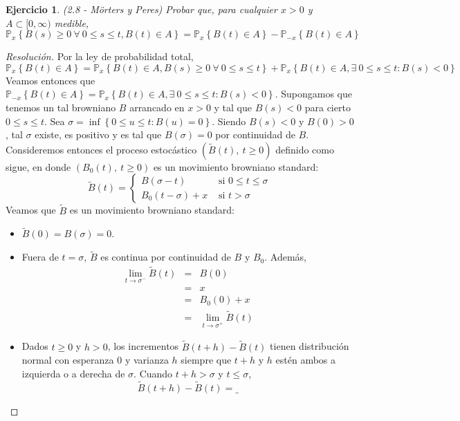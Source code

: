 \documentclass[a4paper,11pt]{article}
\newcommand{\Probx}[2]{\ensuremath{\mathbb{P}_{#1} \left\{ #2 \right\}}}
\newtheorem*{ej}{Ejercicio}
\begin{document}

\begin{ej}
(2.8 - Mörters y Peres) Probar que, para cualquier $x > 0$ y $A \subset [0,\infty)$ medible,
$$\Probx{x}{B(s) \geq 0 ~\forall~ 0 \leq s \leq t, B(t) \in A} = \Probx{x}{B(t) \in A} - \Probx{-x}{B(t) \in A}$$
\end{ej}

\begin{proof}[Resoluci\'on]
Por la ley de probabilidad total,
$$\Probx{x}{B(t) \in A} = \Probx{x}{B(t) \in A, B(s) \geq 0 ~\forall~ 0 \leq s \leq t} + 
    \Probx{x}{B(t) \in A, \exists~0 \leq s \leq t : B(s) < 0}$$
Veamos entonces que $\Probx{-x}{B(t) \in A} = \Probx{x}{B(t) \in A, \exists~0 \leq s \leq t : B(s) < 0}$. Supongamos
que tenemos un tal browniano $B$ arrancado en $x > 0$ y tal que $B(s) < 0$ para cierto $0 \leq s \leq t$.
Sea $\sigma = \inf \left\{ 0 \leq u \leq t : B(u) = 0 \right\}$. Siendo $B(s) < 0$ y $B(0) > 0$, tal $\sigma$    
existe, es positivo y es tal que $B(\sigma) = 0$ por continuidad de $B$. Consideremos entonces el proceso estocástico
$(\tilde{B}(t),~ t \geq 0)$ definido como sigue, en donde $(B_0(t),~t \geq 0)$ es un movimiento browniano standard:
$$
\tilde{B}(t) = 
\begin{cases}
B(\sigma -t) & \textrm{ si } 0 \leq t \leq \sigma \\
B_0(t - \sigma) + x & \textrm{ si } t > \sigma
\end{cases}
$$
Veamos que $\tilde{B}$ es un movimiento browniano standard:
\begin{itemize}
    \item $\tilde{B}(0) = B(\sigma) = 0$.
    \item Fuera de $t = \sigma$, $\tilde{B}$ es continua por continuidad de $B$ y $B_0$. Además,
    \begin{eqnarray*}
        \lim_{t \to \sigma^{-}}{\tilde{B}(t)} &=& B(0) \\
            &=& x \\
            &=& B_0(0) + x \\
            &=& \lim_{t \to \sigma^{+}}{\tilde{B}(t)}
    \end{eqnarray*}
    \item Dados $t \geq 0$ y $h > 0$, los incrementos $\tilde{B}(t+h) - \tilde{B}(t)$ tienen distribución
    normal con esperanza 0 y varianza $h$ siempre que $t+h$ y $h$ estén ambos a izquierda o a derecha
    de $\sigma$. Cuando $t+h > \sigma$ y $t \leq \sigma$,
    $$\tilde{B}(t+h) - \tilde{B}(t) =
            \underbrace{            
}$$
\end{itemize}
\end{proof}
\end{document}
